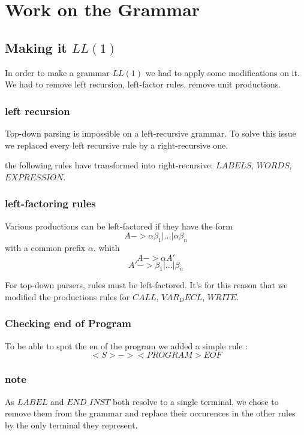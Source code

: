 
\section{Work on the Grammar}


\subsection{Making it $LL(1)$}
In order to make a grammar $LL(1)$ we had to apply some modifications on it. We had to remove left recursion, left-factor rules, remove unit productions.

\subsubsection{left recursion}

Top-down parsing is impossible on a left-recursive grammar. To solve this issue we replaced every left recursive rule by a right-recursive one.

the following rules have transformed into right-recursive: $LABELS$, $WORDS$, $EXPRESSION$.


\subsubsection{left-factoring rules}
Various productions can be left-factored if they have the form
$$A -> \alpha \beta_{1} | ... | \alpha\beta_{n}$$
with a common prefix $\alpha$.
whith
$$A -> \alpha A'$$
$$A' -> \beta_{1} | ... | \beta_{n}$$

For top-down parsers, rules must be left-factored.
It's for this reason that we modified the productions rules for
$CALL$, $VAR_DECL$, $WRITE$.


\subsubsection{Checking end of Program}

To be able to spot the en of the program we added a simple rule :
$$<S> -> <PROGRAM> EOF$$

\subsubsection{note}

As $LABEL$ and $END\_INST$ both resolve to a single terminal, we chose to remove them from the grammar and replace their occurences in the other rules by the only terminal they represent.

